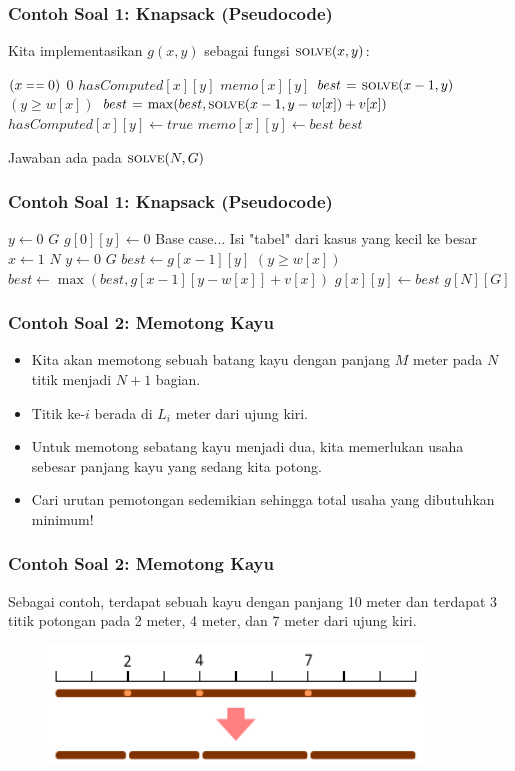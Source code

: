 \begin{frame}
\frametitle{Contoh Soal 1: Knapsack (Pseudocode)}
Kita implementasikan $g(x, y)$ sebagai fungsi $\textnormal{\scshape solve}(x,y)$:
\begin{codebox}
\li \If $(x \isequal 0)$ \Then
\li   \Return $0$
\li \ElseIf $hasComputed[x][y]$ \Then
\li   \Return $memo[x][y]$ 
\li \Else
\li   $best \mathrel{\hspace{1pt}=\hspace{1pt}} \textnormal{\scshape solve}(x-1, y)$
\li   \If $(y \geq w[x])$ \Then
\li     $best \mathrel{\hspace{1pt}=\hspace{1pt}} \max(best, \textnormal{\scshape solve}(x - 1, y-w[x]) + v[x])$
      \End  
\li   $hasComputed[x][y] \gets true$
\li   $memo[x][y] \gets best$
\li   \Return $best$
    \End
\end{codebox}

Jawaban ada pada $\textnormal{\scshape solve}(N, G)$
\end{frame}

\begin{frame}
\frametitle{Contoh Soal 1: Knapsack (Pseudocode)}
\begin{codebox}
\li \For $y \gets 0$ \To $G$ \Do
\li   $g[0][y] \gets 0$ \Comment Base case...
    \End
\zi
\li \Comment Isi "tabel" dari kasus yang kecil ke besar
\li \For $x \gets 1$ \To $N$ \Do
\li   \For $y \gets 0$ \To $G$ \Do
\li     $best \gets g[x-1][y]$
\li     \If $(y \geq w[x])$ \Then
\li       $best \gets \max(best, g[x - 1][y-w[x]] + v[x])$
        \End  
\li     $g[x][y] \gets best$
      \End
    \End    
\li \Return $g[N][G]$
    \End
\end{codebox}
\end{frame}

\begin{frame}
\frametitle{Contoh Soal 2: Memotong Kayu}
\begin{itemize}
  \item Kita akan memotong sebuah batang kayu dengan panjang $M$ meter pada $N$ titik menjadi $N+1$ bagian.
  \item Titik ke-$i$ berada di $L_i$ meter dari ujung kiri.
  \item Untuk memotong sebatang kayu menjadi dua, kita memerlukan usaha \alert{sebesar panjang kayu yang sedang kita potong}.
  \item Cari urutan pemotongan sedemikian sehingga total usaha yang dibutuhkan minimum!
\end{itemize}
\end{frame}

\begin{frame}
\frametitle{Contoh Soal 2: Memotong Kayu}
Sebagai contoh, terdapat sebuah kayu dengan panjang 10 meter dan terdapat 3 titik potongan pada 2 meter, 4 meter, dan 7 meter dari ujung kiri.
\begin{figure}
  \includegraphics[width=10cm]{asset/cutting-stick-1.pdf}
\end{figure}
\end{frame}

